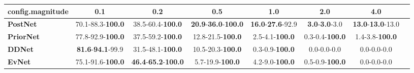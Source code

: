 \begin{tabular}{lccccccc}
\toprule
\textbf{config.magnitude} &                               0.1 &                                         0.2 &                                         0.5 &                               1.0 &                            2.0 &                               4.0 \\
\midrule
\textbf{PostNet } &          70.1-88.3-\textbf{100.0} &                    38.5-60.4-\textbf{100.0} &  \textbf{20.9}-\textbf{36.0}-\textbf{100.0} &  \textbf{16.0}-\textbf{27.6}-92.9 &  \textbf{3.0}-\textbf{3.0}-3.0 &  \textbf{13.0}-\textbf{13.0}-13.0 \\
\textbf{PriorNet} &          77.8-92.9-\textbf{100.0} &                    37.5-59.2-\textbf{100.0} &                    12.8-21.5-\textbf{100.0} &            2.5-4.1-\textbf{100.0} &         0.3-0.4-\textbf{100.0} &            1.4-3.8-\textbf{100.0} \\
\textbf{DDNet   } &  \textbf{81.6}-\textbf{94.1}-99.9 &                    31.5-48.1-\textbf{100.0} &                    10.5-20.3-\textbf{100.0} &            0.3-0.9-\textbf{100.0} &                    0.0-0.0-0.0 &                       0.0-0.0-0.0 \\
\textbf{EvNet   } &          75.1-91.6-\textbf{100.0} &  \textbf{46.4}-\textbf{65.2}-\textbf{100.0} &                     5.7-19.9-\textbf{100.0} &            4.2-9.0-\textbf{100.0} &         0.5-0.9-\textbf{100.0} &                       0.0-0.0-0.0 \\
\bottomrule
\end{tabular}
